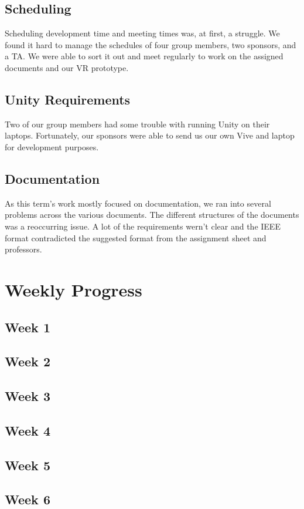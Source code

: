 \documentclass[10pt,journal,compsoc,onecolumn, draftclsnofoot]{IEEEtran}
\begin{document}
\subsection{Scheduling}
Scheduling development time and meeting times was, at first, a struggle.
We found it hard to manage the schedules of four group members, two sponsors, and a TA.
We were able to sort it out and meet regularly to work on the assigned documents and our VR prototype.
\subsection{Unity Requirements}
Two of our group members had some trouble with running Unity on their laptops.
Fortunately, our sponsors were able to send us our own Vive and laptop for development purposes.
\subsection{Documentation}
As this term's work mostly focused on documentation, we ran into several problems across the various documents.
The different structures of the documents was a reoccurring issue.
A lot of the requirements wern't clear and the IEEE format contradicted the suggested format from the assignment sheet and professors.

\section{Weekly Progress}
\subsection{Week 1}
\subsection{Week 2}
\subsection{Week 3}
\subsection{Week 4}
\subsection{Week 5}
\subsection{Week 6}
\end{document}
